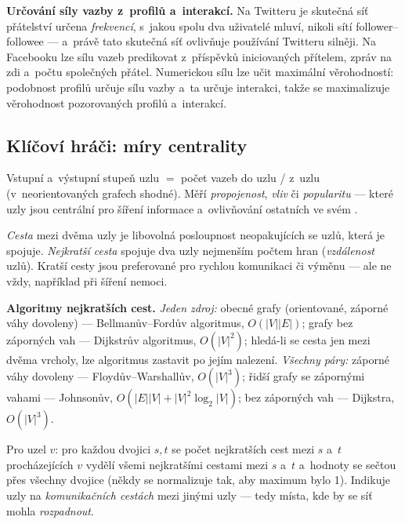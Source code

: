 \documentclass[11pt,a4paper]{article}
\theoremstyle{definition}
\begin{document}
\textbf{Určování síly vazby z~profilů a~interakcí.} Na Twitteru je skutečná síť přátelství
určena \emph{frekvencí}, s~jakou spolu dva uživatelé mluví, nikoli sítí follower--followee ---
a~právě tato skutečná síť ovlivňuje používání Twitteru silněji. Na Facebooku lze sílu vazeb
predikovat z~příspěvků iniciovaných přítelem, zpráv na zdi a~počtu společných přátel.
Numerickou sílu lze učit maximální věrohodností: podobnost profilů určuje sílu vazby a~ta
určuje interakci, takže se maximalizuje věrohodnost pozorovaných profilů a~interakcí.

\subsection{Klíčoví hráči: míry centrality}

\begin{defbox}
Vstupní a~výstupní stupeň uzlu $=$ počet vazeb do uzlu / z~uzlu (v~neorientovaných grafech
shodné). Měří \emph{propojenost}, \emph{vliv} či \emph{popularitu} --- které uzly jsou
centrální pro šíření informace a~ovlivňování ostatních ve svém .
\end{defbox}

\begin{defbox}
\emph{Cesta} mezi dvěma uzly je libovolná posloupnost neopakujících se uzlů, která je spojuje.
\emph{Nejkratší cesta} spojuje dva uzly nejmenším počtem hran (\emph{vzdálenost} uzlů).
Kratší cesty jsou preferované pro rychlou komunikaci či výměnu --- ale ne vždy, například při
šíření nemoci.

\textbf{Algoritmy nejkratších cest.} \emph{Jeden zdroj:} obecné grafy (orientované, záporné
váhy dovoleny) --- Bellmanův--Fordův algoritmus, $O(|V||E|)$; grafy bez záporných vah ---
Dijkstrův algoritmus, $O(|V|^2)$; hledá-li se cesta jen mezi dvěma vrcholy, lze algoritmus
zastavit po jejím nalezení. \emph{Všechny páry:} záporné váhy dovoleny ---
Floydův--Warshallův, $O(|V|^3)$; řidší grafy se zápornými vahami --- Johnsonův,
$O(|E||V|+|V|^2\log_2|V|)$; bez záporných vah --- Dijkstra, $O(|V|^3)$.
\end{defbox}

\begin{defbox}
Pro uzel $v$: pro každou dvojici $s,t$ se počet nejkratších cest mezi $s$ a~$t$ procházejících
$v$ vydělí všemi nejkratšími cestami mezi $s$ a~$t$ a~hodnoty se sečtou přes všechny dvojice
(někdy se normalizuje tak, aby maximum bylo 1). Indikuje uzly na \emph{komunikačních cestách}
mezi jinými uzly --- tedy místa, kde by se síť mohla \emph{rozpadnout}.
\end{defbox}
\end{document}
